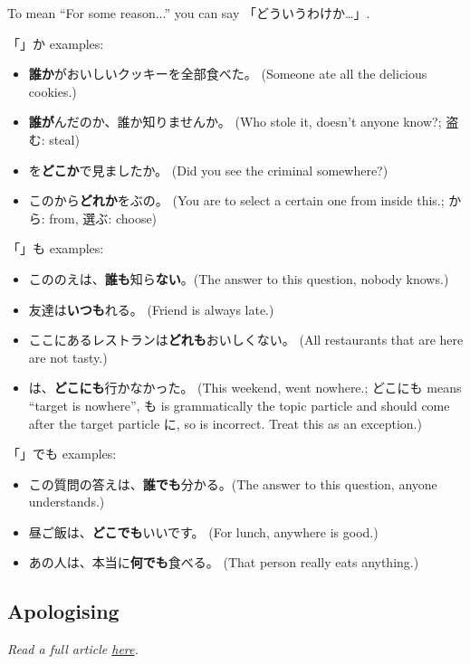 \documentclass[../nihongo-gakushuu-kyouzai.tex]{subfiles}
\begin{document}
To mean ``For some reason...'' you can say 「どういうわけか\dots」.

「」か examples:
\begin{itemize}
    \item \textbf{誰か}がおいしいクッキーを全部食べた。 (Someone ate all the delicious cookies.)
    \item \textbf{誰が}んだのか、誰か知りませんか。 (Who stole it, doesn't anyone know?; 盗む: steal)
    \item {}を\textbf{どこか}で見ましたか。 (Did you see the criminal somewhere?)
    \item このから\textbf{どれか}をぶの。 (You are to select a certain one from inside this.; から: from, 選ぶ: choose)
\end{itemize}

「」も examples:
\begin{itemize}
    \item こののえは、\textbf{誰も}知ら\textbf{ない}。(The answer to this question, nobody knows.)
    \item 友達は\textbf{いつも}れる。 (Friend is always late.)
    \item ここにあるレストランは\textbf{どれも}おいしくない。 (All restaurants that are here are not tasty.)
    \item {}は、\textbf{どこにも}行かなかった。 (This weekend, went nowhere.; どこにも means ``target is nowhere'', も is grammatically the topic particle and should come after the target particle に, so  is incorrect. Treat this as an exception.)
\end{itemize}

「」でも examples:
\begin{itemize}
    \item この質問の答えは、\textbf{誰でも}分かる。(The answer to this question, anyone understands.)
    \item 昼ご飯は、\textbf{どこでも}いいです。 (For lunch, anywhere is good.)
    \item あの人は、本当に\textbf{何でも}食べる。 (That person really eats anything.)
\end{itemize}

\subsection{Apologising}
\emph{Read a full article \href{https://www.clozemaster.com/blog/sorry-in-japanese/}{here}.}
\end{document}
